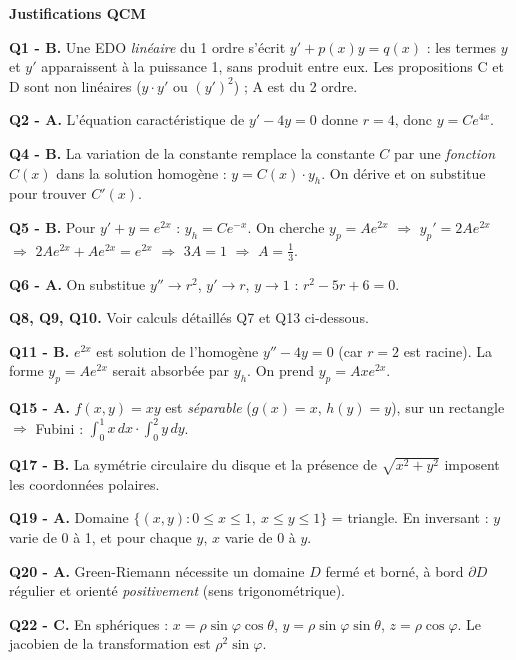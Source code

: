 \documentclass[11pt,a4paper]{article}
\begin{document}
\vspace{4pt}

\noindent\textbf{Justifications QCM}

\smallskip
\noindent\textbf{Q1 - B.} Une EDO \emph{linéaire} du 1\ier{} ordre s'écrit $y' + p(x)y = q(x)$ : les termes $y$ et $y'$ apparaissent à la puissance 1, sans produit entre eux. Les propositions C et D sont non linéaires ($y \cdot y'$ ou $(y')^2$) ; A est du 2\ieme{} ordre.

\smallskip
\noindent\textbf{Q2 - A.} L'équation caractéristique de $y' - 4y = 0$ donne $r = 4$, donc $y = Ce^{4x}$.

\smallskip
\noindent\textbf{Q4 - B.} La variation de la constante remplace la constante $C$ par une \emph{fonction} $C(x)$ dans la solution homogène : $y = C(x)\cdot y_h$. On dérive et on substitue pour trouver $C'(x)$.

\smallskip
\noindent\textbf{Q5 - B.} Pour $y'+y=e^{2x}$ : $y_h=Ce^{-x}$. On cherche $y_p = Ae^{2x}$ $\Rightarrow$ $y_p'=2Ae^{2x}$ $\Rightarrow$ $2Ae^{2x}+Ae^{2x}=e^{2x}$ $\Rightarrow$ $3A=1$ $\Rightarrow$ $A=\tfrac{1}{3}$.

\smallskip
\noindent\textbf{Q6 - A.} On substitue $y''\to r^2$, $y'\to r$, $y\to 1$ : $r^2-5r+6=0$.

\smallskip
\noindent\textbf{Q8, Q9, Q10.} Voir calculs détaillés Q7 et Q13 ci-dessous.

\smallskip
\noindent\textbf{Q11 - B.} $e^{2x}$ est solution de l'homogène $y''-4y=0$ (car $r=2$ est racine). La forme $y_p=Ae^{2x}$ serait absorbée par $y_h$. On prend $y_p=Axe^{2x}$.

\smallskip
\noindent\textbf{Q15 - A.} $f(x,y)=xy$ est \emph{séparable} ($g(x)=x$, $h(y)=y$), sur un rectangle $\Rightarrow$ Fubini : $\int_0^1 x\,dx \cdot \int_0^2 y\,dy$.

\smallskip
\noindent\textbf{Q17 - B.} La symétrie circulaire du disque et la présence de $\sqrt{x^2+y^2}$ imposent les coordonnées polaires.

\smallskip
\noindent\textbf{Q19 - A.} Domaine $\{(x,y):0\le x\le 1,\ x\le y\le 1\}$ = triangle. En inversant : $y$ varie de 0 à 1, et pour chaque $y$, $x$ varie de 0 à $y$.

\smallskip
\noindent\textbf{Q20 - A.} Green-Riemann nécessite un domaine $D$ fermé et borné, à bord $\partial D$ régulier et orienté \emph{positivement} (sens trigonométrique).

\smallskip
\noindent\textbf{Q22 - C.} En sphériques : $x=\rho\sin\varphi\cos\theta$, $y=\rho\sin\varphi\sin\theta$, $z=\rho\cos\varphi$. Le jacobien de la transformation est $\rho^2\sin\varphi$.
\end{document}
